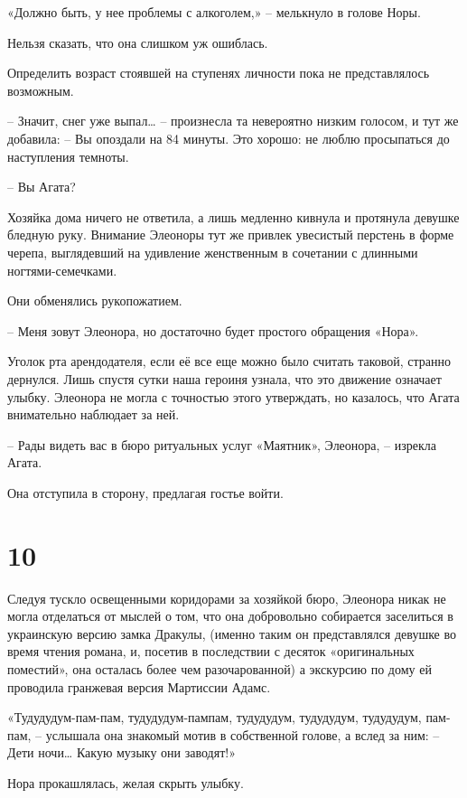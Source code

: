 \documentclass[
  a5paperpaper,
  DIV=11,
  numbers=noendperiod]{scrreprt}
\begin{document}
«Должно быть, у нее проблемы с алкоголем,» -- мелькнуло в голове Норы.

Нельзя сказать, что она слишком уж ошиблась.

Определить возраст стоявшей на ступенях личности пока не представлялось
возможным.

-- Значит, снег уже выпал\ldots{} -- произнесла та невероятно низким
голосом, и тут же добавила: -- Вы опоздали на 84 минуты. Это хорошо: не
люблю просыпаться до наступления темноты.

-- Вы Агата?

Хозяйка дома ничего не ответила, а лишь медленно кивнула и протянула
девушке бледную руку. Внимание Элеоноры тут же привлек увесистый
перстень в форме черепа, выглядевший на удивление женственным в
сочетании с длинными ногтями-семечками.

Они обменялись рукопожатием.

-- Меня зовут Элеонора, но достаточно будет простого обращения «Нора».

Уголок рта арендодателя, если её все еще можно было считать таковой,
странно дернулся. Лишь спустя сутки наша героиня узнала, что это
движение означает улыбку. Элеонора не могла с точностью этого
утверждать, но казалось, что Агата внимательно наблюдает за ней.

-- Рады видеть вас в бюро ритуальных услуг «Маятник», Элеонора, --
изрекла Агата.

Она отступила в сторону, предлагая гостье войти.

\section*{10}\label{10}


Следуя тускло освещенными коридорами за хозяйкой бюро, Элеонора никак не
могла отделаться от мыслей о том, что она добровольно собирается
заселиться в украинскую версию замка Дракулы, (именно таким он
представлялся девушке во время чтения романа, и, посетив в последствии с
десяток «оригинальных поместий», она осталась более чем разочарованной)
а экскурсию по дому ей проводила гранжевая версия Мартиссии Адамс.

«Тудудудум-пам-пам, тудудудум-пампам, тудудудум, тудудудум, тудудудум,
пам-пам, -- услышала она знакомый мотив в собственной голове, а вслед за
ним: -- Дети ночи\ldots{} Какую музыку они заводят!»

Нора прокашлялась, желая скрыть улыбку.
\end{document}
